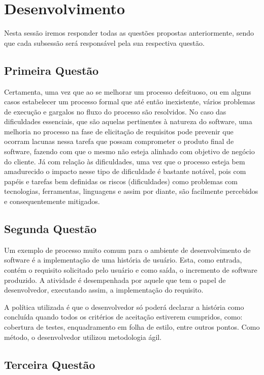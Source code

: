 \chapter[Desenvolvimento ]{Desenvolvimento}

Nesta sessão iremos responder todas as questões propostas anteriormente, sendo
que cada subsessão será responsável pela sua respectiva questão.

\section{Primeira Questão}
\label{sec:Primeira Questão}

Certamenta, uma vez que ao se melhorar um processo defeituoso, ou em alguns casos estabelecer um processo formal que até então inexistente, vários problemas
de execução e gargalos no fluxo do processo são resolvidos. No caso das dificuldades essenciais, que são aquelas pertinentes à natureza do software, uma
melhoria no processo na fase de elicitação de requisitos pode prevenir que ocorram lacunas nessa tarefa que possam comprometer o produto final de software,
fazendo com que o mesmo não esteja alinhado com objetivo de negócio do cliente. Já com relação às dificuldades, uma vez que o processo esteja bem amadurecido
o impacto nesse tipo de dificuldade é bastante notável, pois com papéis e tarefas bem definidas os riscos (dificuldades) como problemas com tecnologias, ferramentas,
linguagens e assim por diante, são facilmente percebidos e consequentemente mitigados.

\section{Segunda Questão}
\label{sec:Segunda Questão}

Um exemplo de processo muito comum para o ambiente de desenvolvimento de software
é a implementação de uma história de usuário. Esta, como entrada, contém o
requisito solicitado pelo usuário e como saída, o incremento de software produzido.
A atividade é desempenhada por aquele que tem o papel de desenvolvedor, executando
assim, a implementação do requisito.

A política utilizada é que o desenvolvedor só poderá declarar a história como
concluída quando todos os critérios de aceitação estiverem cumpridos, como:
cobertura de testes, enquadramento em folha de estilo, entre outros pontos. Como
método, o desenvolvedor utilizou metodologia ágil.

\section{Terceira Questão}
\label{sec:Terceira Questão}

